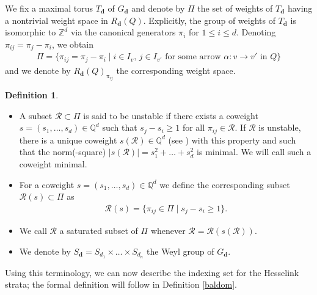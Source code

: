 \documentclass[pdftex]{sigma}
\newcommand{\R}{\mathcal{R}}
\numberwithin{equation}{section}
\theoremstyle{definition}
\newtheorem{Definition}[Theorem]{Definition}
\begin{document}
We fix a maximal torus $T_{\mathbf{d}}$ of $G_{\mathbf{d}}$ and denote by $\Pi$ the set of weights of $T_{\mathbf{d}}$ having a nontrivial weight space in $R_{\mathbf{d}}(Q)$. Explicitly, the group of weights of $T_{\mathbf{d}}$ is isomorphic to $\mathbb{Z}^d$ via the canonical generators $\pi_i$ for $1 \leq i \leq d$. Denoting $\pi_{ij} = \pi_j - \pi_i$, we obtain
 \begin{align*}
 \Pi = \{\pi_{ij} = \pi_j - \pi_i \mid i \in I_v,\, j \in I_{v'} \text{ for some arrow } \alpha\colon v \rightarrow v' \text{ in } Q\}
 \end{align*}
 and we denote by $R_{\mathbf{d}}(Q)_{\pi_{ij}}$ the corresponding weight space.
\begin{Definition}\label{subsetR}\quad
\begin{itemize}\itemsep=0pt
\item[(a)] A subset $\R \subset \Pi$ is said to be unstable if there exists a coweight $s=(s_1, \dots, s_d) \in \mathbb{Q}^d$ such that $s_j -s_i \geq 1$ for all $\pi_{ij} \in \R$.
If $\R$ is unstable, there is a unique coweight $s(\R) \in \mathbb{Q}^d$ (see \cite[Lemma 6.2]{LBB}) with this property and such that the norm(-square) $|s(\R)| = s_1^2 + \dots + s_d^2$ is minimal. We will call such a coweight minimal.

\item[(b)] For a coweight $s=(s_1, \dots, s_d) \in \mathbb{Q}^d$ we define the corresponding subset $\R(s) \subset \Pi$ as
\begin{align*}
 \R(s) = \{\pi_{ij} \in \Pi \mid s_j - s_i \geq 1\}.
\end{align*}

\item[(c)] We call $\R$ a saturated subset of $\Pi$ whenever $\R = \R(s(\R))$.

\item[(d)] We denote by $S_{\mathbf{d}} = S_{d_1} \times \dots \times S_{d_n}$ the Weyl group of $G_{\mathbf{d}}$.
\end{itemize}
\end{Definition}

Using this terminology, we can now describe the indexing set for the Hesselink strata; the formal definition will follow in Definition \ref{baldom}.
\end{document}
